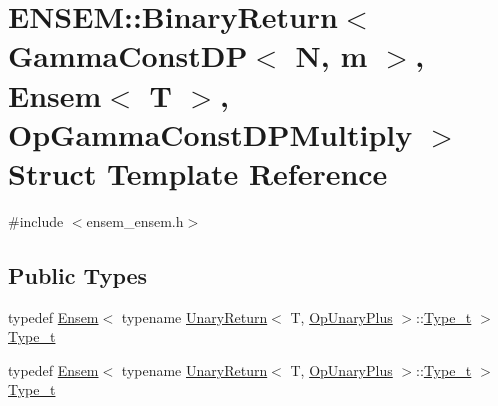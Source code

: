 \hypertarget{structENSEM_1_1BinaryReturn_3_01GammaConstDP_3_01N_00_01m_01_4_00_01Ensem_3_01T_01_4_00_01OpGammaConstDPMultiply_01_4}{}\section{E\+N\+S\+EM\+:\+:Binary\+Return$<$ Gamma\+Const\+DP$<$ N, m $>$, Ensem$<$ T $>$, Op\+Gamma\+Const\+D\+P\+Multiply $>$ Struct Template Reference}
\label{structENSEM_1_1BinaryReturn_3_01GammaConstDP_3_01N_00_01m_01_4_00_01Ensem_3_01T_01_4_00_01OpGammaConstDPMultiply_01_4}


{\ttfamily \#include $<$ensem\+\_\+ensem.\+h$>$}

\subsection*{Public Types}
\begin{DoxyCompactItemize}
\item 
typedef \mbox{\hyperlink{classENSEM_1_1Ensem}{Ensem}}$<$ typename \mbox{\hyperlink{structENSEM_1_1UnaryReturn}{Unary\+Return}}$<$ T, \mbox{\hyperlink{structENSEM_1_1OpUnaryPlus}{Op\+Unary\+Plus}} $>$\+::\mbox{\hyperlink{structENSEM_1_1BinaryReturn_3_01GammaConstDP_3_01N_00_01m_01_4_00_01Ensem_3_01T_01_4_00_01OpGammaConstDPMultiply_01_4_a839d901ca5cc60b6e639f680b072d368}{Type\+\_\+t}} $>$ \mbox{\hyperlink{structENSEM_1_1BinaryReturn_3_01GammaConstDP_3_01N_00_01m_01_4_00_01Ensem_3_01T_01_4_00_01OpGammaConstDPMultiply_01_4_a839d901ca5cc60b6e639f680b072d368}{Type\+\_\+t}}
\item 
typedef \mbox{\hyperlink{classENSEM_1_1Ensem}{Ensem}}$<$ typename \mbox{\hyperlink{structENSEM_1_1UnaryReturn}{Unary\+Return}}$<$ T, \mbox{\hyperlink{structENSEM_1_1OpUnaryPlus}{Op\+Unary\+Plus}} $>$\+::\mbox{\hyperlink{structENSEM_1_1BinaryReturn_3_01GammaConstDP_3_01N_00_01m_01_4_00_01Ensem_3_01T_01_4_00_01OpGammaConstDPMultiply_01_4_a839d901ca5cc60b6e639f680b072d368}{Type\+\_\+t}} $>$ \mbox{\hyperlink{structENSEM_1_1BinaryReturn_3_01GammaConstDP_3_01N_00_01m_01_4_00_01Ensem_3_01T_01_4_00_01OpGammaConstDPMultiply_01_4_a839d901ca5cc60b6e639f680b072d368}{Type\+\_\+t}}
\end{DoxyCompactItemize}


